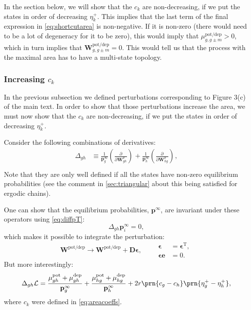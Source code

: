 \documentclass[9pt,twocolumn,twoside,lineno]{pnas-new}
\newcommand{\pdiffc}[3][]{\left(\frac{\partial #2}{\partial {#3}}\right)_{\!\!#1}}
\newcommand{\CL}{\mathcal{L}}
\newcommand{\trans}{^\mathrm{T}}
\newcommand{\onev}{\mathbf{e}}
\newcommand{\prob}{\mathbf{p}}
\newcommand{\eq}{\prob^\infty}
\newcommand{\D}{\mathbf{D}}
\newcommand{\W}{\mathbf{W}}
\newcommand{\frg}{\W^{\mathrm{F}}}
\newcommand{\pot}{^{\text{pot}}}
\newcommand{\dep}{^{\text{dep}}}
\newcommand{\potdep}{^{\text{pot/dep}}}
\providecommand\hyperref[2][1]{#2}
\providecommand\texorpdfstring[2]{#1}
\begin{document}
\begin{strip}
In the \hyperref[sec:areacoeffincr]{section below}, we will show that the $c_k$ are non-decreasing, if we put the states in order of decreasing $\eta^+_k$.
This implies that the last term of the final expression in \cref{eq:shortcutarea} is non-negative.
If it is non-zero (there would need to be a lot of degeneracy for it to be zero), this would imply that $\mu\potdep _{g,g\pm m}>0$, which in turn implies that $\W\potdep _{g,g\pm m}=0$.
This would tell us that the process with the maximal area has to have a multi-state topology.

\subsubsection{Increasing \texorpdfstring{$c_k$}{c(k)}}\label{sec:areacoeffincr}

In the \hyperref[sec:shortcuts]{previous subsection} we defined perturbations corresponding to Figure 3(c) of the main text.
In order to show that those perturbations increase the area, we must now show that the $c_k$ are non-decreasing, if we put the states in order of decreasing $\eta^+_k$.

Consider the following combinations of derivatives:
%
\begin{align}
\label{eq:areacoeffincrderiv}
    \Delta_{gh} &\equiv
      \frac{1}{\eq_{g}} \pdiffc{}{\frg_{gh}}
      + \frac{1}{\eq_h} \pdiffc{}{\frg_{hg}}, \\
\end{align}
%
Note that they are only well defined if all the states have non-zero equilibrium probabilities (see the comment in \cref{sec:triangular} about this being satisfied for ergodic chains).

One can show that the equilibrium probabilities, $\eq$, are invariant under these operators using \cref{eq:diffpT}:
%
\begin{equation}\label{eq:sareacoeffincrprob}
  \Delta_{gh} \eq_i = 0,
\end{equation}
%
which makes it possible to integrate the perturbation:
%
\begin{equation}\label{eq:areacoeffincrfinite}
  \W\potdep  \to \W\potdep  + \D\boldsymbol{\epsilon},
  \qquad
  \begin{aligned}
  \boldsymbol{\epsilon} &= \boldsymbol{\epsilon}\trans,
  \\
  \boldsymbol{\epsilon} \onev &= 0.
  \end{aligned}
\end{equation}
%
But more interestingly:
%
\begin{align}
\label{eq:areacoeffincr}
    \Delta_{gh}\CL &=
      \frac{\mu\pot _{gh}+\mu\dep _{gh}}{\eq_g} + \frac{\mu\pot _{hg}+\mu\dep _{hg}}{\eq_h}
      + 2r\prn{c_g-c_h}\prn{\eta^+_{g} - \eta^+_{h}},\\
\end{align}
%
where $c_k$ were defined in \cref{eq:areacoeffs}.


\end{strip}
\end{document}
